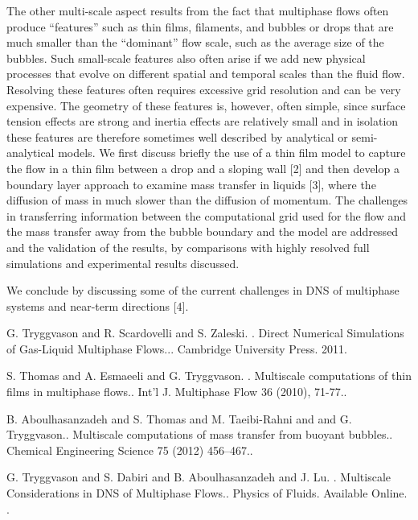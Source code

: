 \documentclass[article,A4,11pt]{llncs}%
\begin{document}
The other multi-scale aspect results from the fact that multiphase flows often produce ``features'' such as thin films, filaments, and bubbles or drops that are much smaller than the “dominant” flow scale, such as the average size of the bubbles. Such small-scale features also often arise if we add new physical processes that evolve on different spatial and temporal scales than the fluid flow. Resolving these features often requires excessive grid resolution and can be very expensive. The geometry of these features is, however, often simple, since surface tension effects are strong and inertia effects are relatively small and in isolation these features are therefore sometimes well described by analytical or semi-analytical models. We first discuss briefly the use of a thin film model to capture the flow in a thin film between a drop and a sloping wall [2] and then develop a boundary layer approach to examine mass transfer in liquids [3], where the diffusion of mass in much slower than the diffusion of momentum. The challenges in transferring information between the computational grid used for the flow and the mass transfer away from the bubble boundary and the model are addressed and the validation of the results, by comparisons with highly resolved full simulations and experimental results discussed.

We conclude by discussing some of the current challenges in DNS of multiphase systems and near-term directions [4].


\begin{thebibliography}{10}
{\sc G. Tryggvason and R. Scardovelli and S. Zaleski. }. {Direct Numerical Simulations of Gas-Liquid Multiphase Flows..}. Cambridge University Press. 2011.

{\sc S. Thomas and A. Esmaeeli and G. Tryggvason. }. {Multiscale computations of thin films in multiphase flows.}. Int'l J. Multiphase Flow 36 (2010), 71-77..

{\sc B. Aboulhasanzadeh and S. Thomas and M. Taeibi-Rahni and and G. Tryggvason.}. {Multiscale computations of mass transfer from buoyant bubbles.}. Chemical Engineering Science 75 (2012) 456–467..

{\sc G. Tryggvason and S. Dabiri and B. Aboulhasanzadeh and J. Lu. }. {Multiscale Considerations in DNS of Multiphase Flows.}. Physics of Fluids. Available Online. .
\end{thebibliography}
\end{document}
